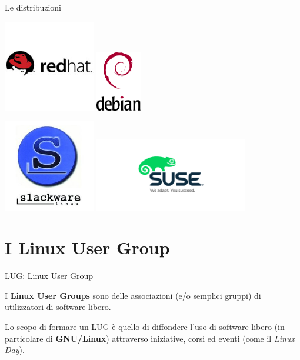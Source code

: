 \documentclass[10pt]{beamer}
\begin{document}
\begin{frame}[fragile]{Le distribuzioni}

\centering
\includegraphics[width=0.3\textwidth]{red_hat}
\includegraphics[width=0.15\textwidth]{debian}

\includegraphics[width=0.3\textwidth]{slackware}
\includegraphics[width=0.5\textwidth]{suse}

\end{frame}

\section{I Linux User Group}

\begin{frame}{LUG: Linux User Group}

I \textbf{Linux User Groups} sono delle associazioni (e/o semplici gruppi) di utilizzatori di software libero.

Lo scopo di formare un LUG è quello di diffondere l'uso di software libero (in particolare di \textbf{GNU/Linux}) attraverso iniziative, corsi ed eventi (come il \textit{Linux Day}).

\end{frame}
\end{document}
